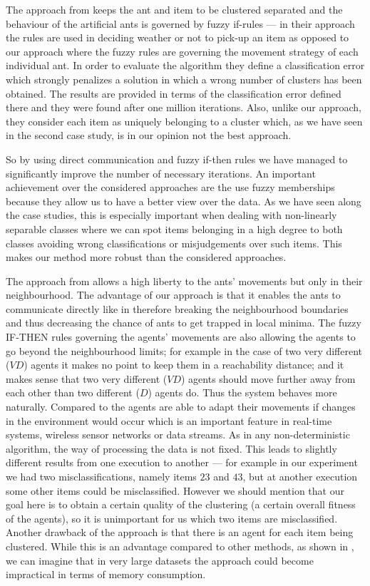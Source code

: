 The approach from \cite{Schockaert04Fuzzy} keeps the ant and item to be clustered separated and the behaviour of the artificial ants is governed by fuzzy if-rules --- in their approach the rules are used in deciding weather or not to pick-up an item as opposed to our approach where the fuzzy rules are governing the movement strategy of each individual ant. In order to evaluate the algorithm they define a classification error which strongly penalizes a  solution in which a wrong number of clusters has been obtained. The results are provided in terms of the classification error defined there and they were found after one million iterations. Also, unlike our approach, they consider each item as uniquely belonging to a cluster which, as we have seen in the second case study, is in our opinion not the best approach. 

So by using direct communication and fuzzy if-then rules we have managed to significantly improve the number of necessary iterations. An important achievement over the considered approaches are the use fuzzy memberships because they allow us to have a better view over the data. As we have seen along the case studies, this is especially important when dealing with non-linearly separable classes where we can spot items belonging in a high degree to both classes avoiding wrong classifications or misjudgements over such items. This makes our method more robust than the considered approaches. 

The approach from \cite{Chen04AnAdaptive} allows a high liberty to the ants' movements but only in their neighbourhood. The advantage of our approach is that it enables the  ants to communicate directly like in \cite{Chira07Stigmergic} therefore breaking the neighbourhood boundaries and thus decreasing the chance of ants to get trapped in local minima. The fuzzy IF-THEN rules governing the agents' movements are also allowing the agents to go beyond the neighbourhood limits; for example in the case of two very different ($VD$) agents it makes no point to keep them in a reachability distance; and it makes sense that two very different ($VD$) agents should move further away from each other than two different ($D$) agents do. Thus the system behaves more naturally. Compared to \cite{Gaceanu10AnAdaptive} the agents are able to adapt their movements if changes in the environment would occur which is an important feature in real-time systems, wireless sensor networks or data streams. As in any non-deterministic algorithm, the way of processing the data is not fixed. This leads to slightly different results from one execution to another --- for example in our experiment we had two misclassifications, namely items $23$ and $43$, but at another execution some other items could be misclassified. However we should mention that our goal here is to obtain a certain quality of the clustering (a certain overall fitness of the agents), so it is unimportant for us which two items are misclassified. Another drawback of the approach is that there is an agent for each item being clustered. While this is an advantage compared to other methods, as shown in \cite{Chen04AnAdaptive}, we can imagine that in very large datasets the approach could become impractical in terms of memory consumption.

